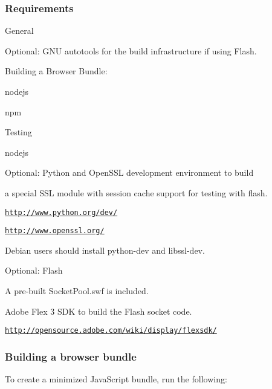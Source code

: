 \subsubsection*{Requirements}


\begin{DoxyItemize}
\item General
\begin{DoxyItemize}
\item Optional\+: G\+NU autotools for the build infrastructure if using Flash.
\end{DoxyItemize}
\item Building a Browser Bundle\+:
\begin{DoxyItemize}
\item nodejs
\item npm
\end{DoxyItemize}
\item Testing
\begin{DoxyItemize}
\item nodejs
\item Optional\+: Python and Open\+S\+SL development environment to build
\item a special S\+SL module with session cache support for testing with flash.
\item \href{http://www.python.org/dev/}{\tt http\+://www.\+python.\+org/dev/}
\item \href{http://www.openssl.org/}{\tt http\+://www.\+openssl.\+org/}
\item Debian users should install python-\/dev and libssl-\/dev.
\end{DoxyItemize}
\item Optional\+: Flash
\begin{DoxyItemize}
\item A pre-\/built Socket\+Pool.\+swf is included.
\item Adobe Flex 3 S\+DK to build the Flash socket code.
\item \href{http://opensource.adobe.com/wiki/display/flexsdk/}{\tt http\+://opensource.\+adobe.\+com/wiki/display/flexsdk/}
\end{DoxyItemize}
\end{DoxyItemize}

\subsubsection*{Building a browser bundle}

To create a minimized Java\+Script bundle, run the following\+:


